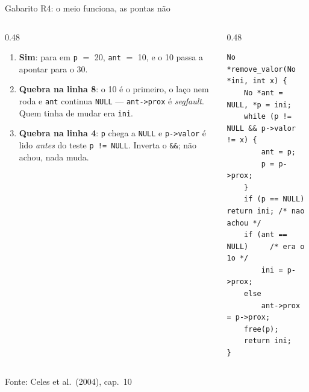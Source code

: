 \documentclass[aspectratio=169]{beamer}
\newcommand{\fonte}[1]{\vfill\hfill{\scriptsize\textcolor{UFSGray}{Fonte: #1}}}
\begin{document}
\begin{frame}[fragile]{Gabarito R4: o meio funciona, as pontas não}
  \begin{columns}[T]
    \begin{column}{0.48\textwidth}
      \scriptsize
      \begin{enumerate}
        \item[(a)] \textbf{Sim}: para em \texttt{p} $=$ 20, \texttt{ant} $=$
          10, e o 10 passa a apontar para o 30.
        \item[(b)] \textbf{Quebra na linha 8}: o 10 é o primeiro, o laço
          nem roda e \texttt{ant} continua \texttt{NULL} ---
          \texttt{ant->prox} é \emph{segfault}. Quem tinha de mudar era
          \texttt{ini}.
        \item[(c)] \textbf{Quebra na linha 4}: \texttt{p} chega a
          \texttt{NULL} e \texttt{p->valor} é lido \emph{antes} do teste
          \texttt{p != NULL}. Inverta o \texttt{\&\&}; não achou, nada muda.
      \end{enumerate}
    \end{column}
    \begin{column}{0.48\textwidth}
\begin{lstlisting}[style=tinyC]
No *remove_valor(No *ini, int x) {
    No *ant = NULL, *p = ini;
    while (p != NULL && p->valor != x) {
        ant = p;
        p = p->prox;
    }
    if (p == NULL) return ini; /* nao achou */
    if (ant == NULL)     /* era o 1o */
        ini = p->prox;
    else
        ant->prox = p->prox;
    free(p);
    return ini;
}
\end{lstlisting}
    \end{column}
  \end{columns}
  \fonte{Celes et al.\ (2004), cap.~10~\cite{celes2004introducao}}
\end{frame}
\end{document}
